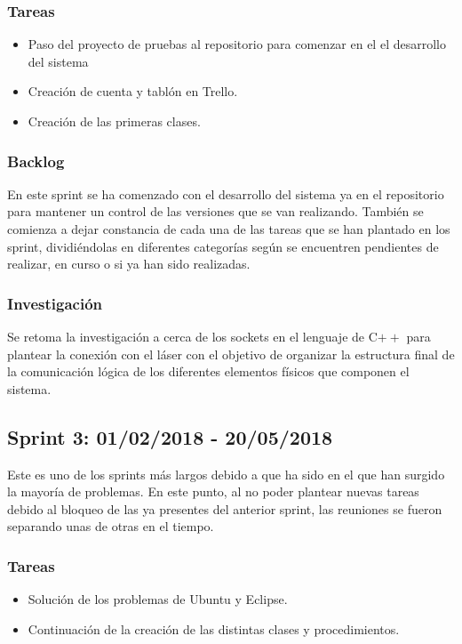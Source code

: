 \subsubsection{Tareas}
\begin{itemize}
	\item Paso del proyecto de pruebas al repositorio para comenzar en el el desarrollo del sistema 
	\item Creación de cuenta y tablón en Trello.
	\item Creación de las primeras clases.
\end{itemize}
\subsubsection{Backlog}
En este sprint se ha comenzado con el desarrollo del sistema ya en el repositorio para mantener un control de las versiones que se van realizando. También se comienza a dejar constancia de cada una de las tareas que se han plantado en los sprint, dividiéndolas en diferentes categorías según se encuentren pendientes de realizar, en curso o si ya han sido realizadas.
\subsubsection{Investigación}
Se retoma la investigación a cerca de los sockets en el lenguaje de C$++$ para plantear la conexión con el láser con el objetivo de organizar la estructura final de la comunicación lógica de los diferentes elementos físicos que componen el sistema.

\subsection{Sprint 3: 01/02/2018 - 20/05/2018}
Este es uno de los sprints más largos debido a que ha sido en el que han surgido la mayoría de problemas. En este punto, al no poder plantear nuevas tareas debido al bloqueo de las ya presentes del anterior sprint, las reuniones se fueron separando unas de otras en el tiempo. 
\subsubsection{Tareas}
\begin{itemize}
	\item Solución de los problemas de Ubuntu y Eclipse.
	\item Continuación de la creación de las distintas clases y procedimientos.
\end{itemize}
